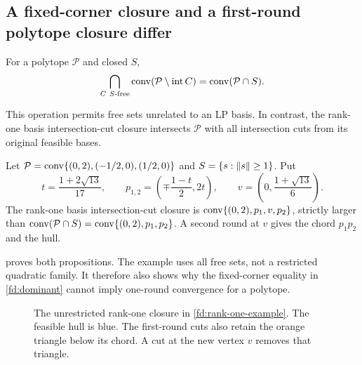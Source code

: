\subsection{A fixed-corner closure and a first-round polytope closure differ}

\begin{proposition}\label{fd:nonlocal-hull}
For a polytope $\mathcal P$ and closed $S$,
\[
 \bigcap_{C\ S\text{-free}}\operatorname{conv}(\mathcal P\setminus\operatorname{int} C)
 =\operatorname{conv}(\mathcal P\cap S).
\]
\end{proposition}
This operation permits free sets unrelated to an LP basis. In contrast,
the rank-one basis intersection-cut closure intersects $\mathcal P$ with
all intersection cuts from its original feasible bases.

\begin{proposition}
\label{fd:rank-one-example}
Let $\mathcal P=\operatorname{conv}\{(0,2),(-1/2,0),(1/2,0)\}$ and
$S=\{s:\lVert s\rVert\ge1\}$. Put
\[
 t=\frac{1+2\sqrt{13}}{17},\qquad
 p_{1,2}=\left(\mp\frac{1-t}{2},2t\right),\qquad
 v=\left(0,\frac{1+\sqrt{13}}6\right).
\]
The rank-one basis intersection-cut closure is
$\operatorname{conv}\{(0,2),p_1,v,p_2\}$, strictly larger than
$\operatorname{conv}(\mathcal P\cap S)=\operatorname{conv}\{(0,2),p_1,p_2\}$.
A second round at $v$ gives the chord $p_1p_2$ and the hull.
\end{proposition}
 proves both propositions. The example uses
all free sets, not a restricted quadratic family. It therefore also
shows why the fixed-corner equality in \cref{fd:dominant} cannot imply
one-round convergence for a polytope.

\begin{figure}[htbp]
 \centering
 
 \caption{The unrestricted rank-one closure in
 \cref{fd:rank-one-example}. The feasible hull is blue. The first-round
 cuts also retain the orange triangle below its chord. A cut at the new
 vertex $v$ removes that triangle.}
 \label{fd:rank-one-figure}
\end{figure}
